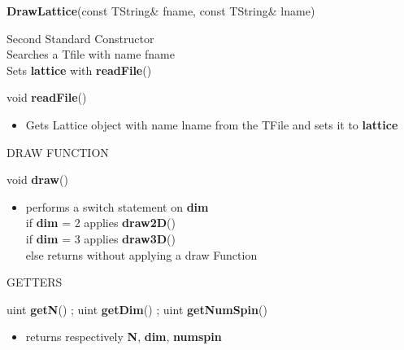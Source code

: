 \begin{itemize}
\begin{itemize}
\begin{itemize}
    \end{itemize}

  \item[] \textbf{DrawLattice}(const TString\& \textunderscore fname, const TString\&                                                                                                           \textunderscore lname)
    \begin{itemize}
    \item[] Second Standard Constructor \\
      Searches a Tfile with name \textunderscore fname \\
      Sets \textbf{lattice} with \textbf{readFile}()
      {\small
      \item[] void \textbf{readFile}()
        \begin{itemize}
        \item[] Gets Lattice object with name \textunderscore lname
          from the TFile and sets it to \textbf{lattice}
        \end{itemize}
      }
    \end{itemize}

    \newpage

  \item[] DRAW FUNCTION \\

  \item[] void \textbf{draw}()
    \begin{itemize}
    \item[] performs a switch statement on \textbf{dim} \\
      if \textbf{dim} = 2 applies \textbf{draw2D}() \\
      if \textbf{dim} = 3 applies \textbf{draw3D}() \\
      else returns without applying a draw Function
    \end{itemize}

  \item[]       GETTERS \\

  \item[] uint \textbf{getN}() ; uint \textbf{getDim}() ; uint \textbf{getNumSpin}()
    \begin{itemize}
    \item[] returns respectively \textbf{N}, \textbf{dim}, \textbf{num\textunderscore spin}
    \end{itemize}

  \end{itemize}


\end{itemize}
